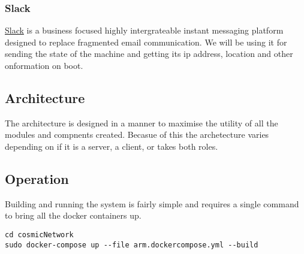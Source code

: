 \subsubsection{Slack}
\href{https://slack.com/}{Slack} is a business focused highly intergrateable instant messaging platform designed to replace fragmented email communication. We will be using it for sending the state of the machine and getting its ip address, location and other onformation on boot.

\subsection{Architecture}
The architecture is designed in a manner to maximise the utility of all the modules and compnents created. Becasue of this the archetecture varies depending on if it is a server, a client, or takes both roles.



\subsection{Operation}

Building and running the system is fairly simple and requires a single command to bring all the docker containers up.

\begin{verbatim}
cd cosmicNetwork
sudo docker-compose up --file arm.dockercompose.yml --build
\end{verbatim}